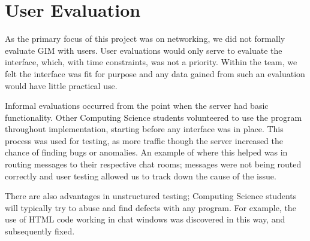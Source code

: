 \section{User Evaluation}
\label{user_eval}

As the primary focus of this project was on networking, we did not formally evaluate GIM with users. User evaluations would only serve to evaluate the interface, which, with time constraints, was not a priority. Within the team, we felt the interface was fit for purpose and any data gained from such an evaluation would have little practical use.

Informal evaluations occurred from the point when the server had basic functionality. Other Computing Science students volunteered to use the program throughout implementation, starting before any interface was in place. This process was used for testing, as more traffic though the server increased the chance of finding bugs or anomalies. An example of where this helped was in routing messages to their respective chat rooms; messages were not being routed correctly and user testing allowed us to track down the cause of the issue.

There are also advantages in unstructured testing; Computing Science students will typically try to abuse and find defects with any program. For example, the use of HTML code working in chat windows was discovered in this way, and subsequently fixed.
